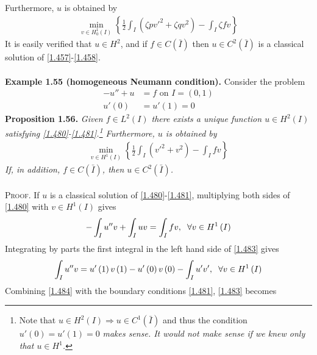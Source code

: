 \documentclass[a4paper,oneside]{book}
\numberwithin{equation}{chapter}
\begin{document}
Furthermore, $u$ is obtained by
\begin{align}
\mathop {\min }\limits_{v \in H_0^1\left( I \right)} \left\{ {\frac{1}{2}\int_I {\left( {\zeta pv{'^2} + \zeta q{v^2}} \right)}  - \int_I {\zeta fv} } \right\}
\end{align}
It is easily verified that $u\in H^2$, and if $f\in C\left(\bar I\right)$ then $u\in C^2\left(\bar I\right)$ is a classical solution of \eqref{1.457}-\eqref{1.458}.\\
\\
\textbf{Example 1.55 (homogeneous Neumann condition).} Consider the problem
\begin{align}
\label{1.480}
 - u'' + u &= f\mbox{ on } I = \left( {0,1} \right)\\
u'\left( 0 \right)& = u'\left( 1 \right) = 0 \label{1.481}
\end{align}
\textbf{Proposition 1.56.} \textit{Given $f\in L^2\left(I\right)$ there exists a unique function $u\in H^2\left(I\right)$ satisfying \eqref{1.480}-\eqref{1.481}.\footnote{Note that $u \in {H^2}\left( I \right) \Rightarrow u \in {C^1}\left( {\bar I} \right)$ and thus the condition $u'\left(0\right)=u'\left(1\right)=0$ \textit{makes sense. It would not make sense if we knew only that $u\in H^1$.}} Furthermore, $u$ is obtained by}
\begin{align}
\mathop {\min }\limits_{v \in {H^1}\left( I \right)} \left\{ {\frac{1}{2}\int_I {\left( {v{'^2} + {v^2}} \right)}  - \int_I {fv} } \right\}
\end{align}
\textit{If, in addition, $f\in C\left(\bar I\right)$, then $u\in C^2\left(\bar I\right)$.}\\
\\
\textsc{Proof.} If $u$ is a classical solution of \eqref{1.480}-\eqref{1.481}, multiplying both sides of \eqref{1.480} with $v\in H^1\left(I\right)$ gives
\begin{align}
\label{1.483}
 - \int_I {u''v}  + \int_I {uv}  = \int_I {fv} ,\hspace{0.2cm}\forall v \in {H^1}\left( I \right)
\end{align}
Integrating by parts the first integral in the left hand side of \eqref{1.483} gives
\begin{align}
\label{1.484}
\int_I {u''v}  = u'\left( 1 \right)v\left( 1 \right) - u'\left( 0 \right)v\left( 0 \right) - \int_I {u'v'} ,\hspace{0.2cm}\forall v \in {H^1}\left( I \right)
\end{align}
Combining \eqref{1.484} with the boundary conditions \eqref{1.481}, \eqref{1.483} becomes
\end{document}

